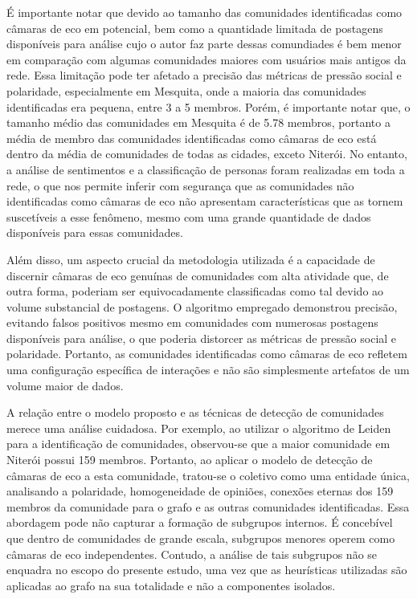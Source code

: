 É importante notar que devido ao tamanho das comunidades identificadas como câmaras de eco em potencial, bem como a quantidade limitada de postagens disponíveis para análise cujo o autor faz parte dessas comundiades é bem menor em comparação com algumas comunidades maiores com usuários mais antigos da rede. Essa limitação pode ter afetado a precisão das métricas de pressão social e polaridade, especialmente em Mesquita, onde a maioria das comunidades identificadas era pequena, entre 3 a 5 membros. Porém, é importante notar que, o tamanho médio das comunidades em Mesquita é de 5.78 membros, portanto a média de membro das comunidades identificadas como câmaras de eco está dentro da média de comunidades de todas as cidades, exceto Niterói. No entanto, a análise de sentimentos e a classificação de personas foram realizadas em toda a rede, o que nos permite inferir com segurança que as comunidades não identificadas como câmaras de eco não apresentam características que as tornem suscetíveis a esse fenômeno, mesmo com uma grande quantidade de dados disponíveis para essas comunidades.

Além disso, um aspecto crucial da metodologia utilizada é a capacidade de discernir câmaras de eco genuínas de comunidades com alta atividade que, de outra forma, poderiam ser equivocadamente classificadas como tal devido ao volume substancial de postagens. O algoritmo empregado demonstrou precisão, evitando falsos positivos mesmo em comunidades com numerosas postagens disponíveis para análise, o que poderia distorcer as métricas de pressão social e polaridade. Portanto, as comunidades identificadas como câmaras de eco refletem uma configuração específica de interações e não são simplesmente artefatos de um volume maior de dados.

A relação entre o modelo proposto e as técnicas de detecção de comunidades merece uma análise cuidadosa. Por exemplo, ao utilizar o algoritmo de Leiden para a identificação de comunidades, observou-se que a maior comunidade em Niterói possui 159 membros. Portanto, ao aplicar o modelo de detecção de câmaras de eco a esta comunidade, tratou-se o coletivo como uma entidade única, analisando a polaridade, homogeneidade de opiniões, conexões eternas dos 159 membros da comunidade para o grafo e as outras comunidades identificadas. Essa abordagem pode não capturar a formação de subgrupos internos. É concebível que dentro de comunidades de grande escala, subgrupos menores operem como câmaras de eco independentes. Contudo, a análise de tais subgrupos não se enquadra no escopo do presente estudo, uma vez que as heurísticas utilizadas são aplicadas ao grafo na sua totalidade e não a componentes isolados.

